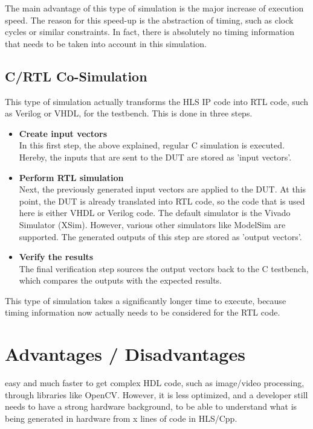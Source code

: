 The main advantage of this type of simulation is the major increase of execution speed.
The reason for this speed-up is the abstraction of timing, such as clock cycles or similar constraints.
In fact, there is absolutely no timing information that needs to be taken into account in this simulation.

\subsection{C/RTL Co-Simulation}

This type of simulation actually transforms the HLS IP code into RTL code, such as Verilog or VHDL, for the testbench.
This is done in three steps.\\

\begin{itemize}
  \item \textbf{Create input vectors}\\
  In this first step, the above explained, regular C simulation is executed.
  Hereby, the inputs that are sent to the DUT are stored as 'input vectors'.

  \item \textbf{Perform RTL simulation}\\
  Next, the previously generated input vectors are applied to the DUT.
  At this point, the DUT is already translated into RTL code, so the code that is used here is either VHDL or Verilog code.
  The default simulator is the Vivado Simulator (XSim).
  However, various other simulators like ModelSim are supported.
  The generated outputs of this step are stored as 'output vectors'.
  \item \textbf{Verify the results}\\
  The final verification step sources the output vectors back to the C testbench, which compares the outputs with the expected results.\\
\end{itemize}

\noindent
This type of simulation takes a significantly longer time to execute, because timing information now actually needs to be considered for the RTL code.

\section{Advantages / Disadvantages}

easy and much faster to get complex HDL code, such as image/video processing, through libraries like OpenCV. However, it is less optimized, and a developer still needs to have a strong hardware background, to be able to understand what is being generated in hardware from x lines of code in HLS/Cpp.
